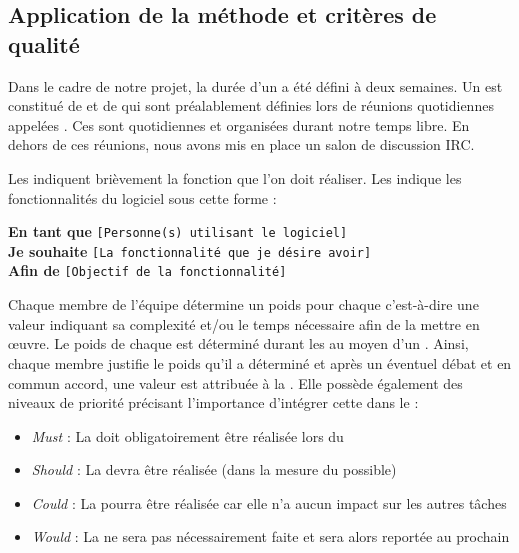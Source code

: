 \subsection{Application de la méthode  et critères de qualité}
Dans le cadre de notre projet, la durée d'un  a été défini à deux semaines. Un  est constitué de  et de 
 qui sont préalablement définies lors de réunions quotidiennes appelées . Ces  sont quotidiennes et organisées durant notre temps libre. En dehors de ces réunions, nous avons mis en place un salon
de discussion IRC.  

Les  indiquent brièvement la fonction que l'on doit réaliser. Les  indique les fonctionnalités du logiciel sous cette forme :

\begin{exemple}
	\textbf{En tant que} \texttt{[Personne(s) utilisant le logiciel]}\\
	\textbf{Je souhaite} \texttt{[La fonctionnalité que je désire avoir]}\\
	\textbf{Afin de} \texttt{[Objectif de la fonctionnalité]}
\end{exemple}

Chaque membre de l'équipe détermine un poids pour chaque  c'est-à-dire une valeur indiquant sa complexité et/ou le temps nécessaire afin de la mettre en œuvre. Le poids de chaque  est déterminé durant les  au moyen d’un .  Ainsi, chaque membre justifie le poids qu'il a déterminé et après un éventuel débat et en commun accord, une valeur est attribuée à la . Elle possède également des niveaux de priorité précisant
l'importance d’intégrer cette  dans le : 

\begin{itemize}
	\item \textit{Must} : La  doit obligatoirement être réalisée lors du 
	\item \textit{Should} : La  devra être réalisée (dans la mesure du possible)
	\item \textit{Could} : La  pourra être réalisée car elle n’a aucun impact sur les autres tâches
	\item \textit{Would} : La  ne sera pas nécessairement faite et sera alors reportée au prochain 
\end{itemize}

